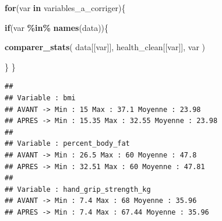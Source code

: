 \documentclass[
]{article}
\newenvironment{Shaded}{\begin{snugshade}}{\end{snugshade}}
\newcommand{\ControlFlowTok}[1]{\textcolor[rgb]{0.13,0.29,0.53}{\textbf{#1}}}
\newcommand{\FunctionTok}[1]{\textcolor[rgb]{0.13,0.29,0.53}{\textbf{#1}}}
\newcommand{\NormalTok}[1]{#1}
\newcommand{\SpecialCharTok}[1]{\textcolor[rgb]{0.81,0.36,0.00}{\textbf{#1}}}
\begin{document}
\begin{Shaded}
\begin{Highlighting}[]
\ControlFlowTok{for}\NormalTok{(var }\ControlFlowTok{in}\NormalTok{ variables\_a\_corriger)\{}

\ControlFlowTok{if}\NormalTok{(var }\SpecialCharTok{\%in\%} \FunctionTok{names}\NormalTok{(data))\{}

\FunctionTok{comparer\_stats}\NormalTok{(}
\NormalTok{data[[var]],}
\NormalTok{health\_clean[[var]],}
\NormalTok{var}
\NormalTok{)}

\NormalTok{\}}
\NormalTok{\}}
\end{Highlighting}
\end{Shaded}

\begin{verbatim}
## 
## Variable : bmi 
## AVANT -> Min : 15 Max : 37.1 Moyenne : 23.98 
## APRES -> Min : 15.35 Max : 32.55 Moyenne : 23.98 
## 
## Variable : percent_body_fat 
## AVANT -> Min : 26.5 Max : 60 Moyenne : 47.8 
## APRES -> Min : 32.51 Max : 60 Moyenne : 47.81 
## 
## Variable : hand_grip_strength_kg 
## AVANT -> Min : 7.4 Max : 68 Moyenne : 35.96 
## APRES -> Min : 7.4 Max : 67.44 Moyenne : 35.96
\end{verbatim}
\end{document}
